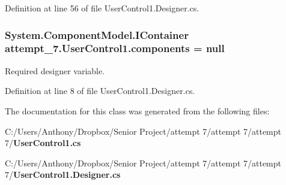 Definition at line 56 of file UserControl1.Designer.cs.

\subsubsection[{components}]{\setlength{\rightskip}{0pt plus 5cm}System.ComponentModel.IContainer {\bf attempt\_\-7.UserControl1.components} = null\hspace{0.3cm}{\ttfamily  [private]}}\label{classattempt__7_1_1_user_control1_ae04c619a57a3116c297c884613866267}


Required designer variable. 



Definition at line 8 of file UserControl1.Designer.cs.



The documentation for this class was generated from the following files:\begin{DoxyCompactItemize}
\item 
C:/Users/Anthony/Dropbox/Senior Project/attempt 7/attempt 7/attempt 7/{\bf UserControl1.cs}\item 
C:/Users/Anthony/Dropbox/Senior Project/attempt 7/attempt 7/attempt 7/{\bf UserControl1.Designer.cs}\end{DoxyCompactItemize}
